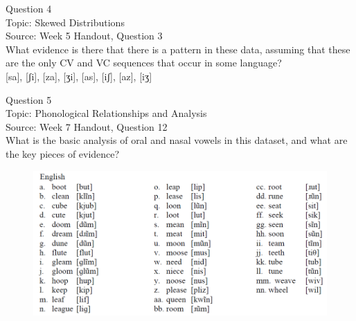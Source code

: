 \documentclass[12pt]{article}
\begin{document}
{\large Question 4}\\

Topic: Skewed Distributions\\
Source: Week 5 Handout, Question 3\\

What evidence is there that there is a pattern in these data, assuming that these are the only CV and VC sequences that occur in some language?\\

{[sa]}, {[ʃi]}, {[za]}, {[ʒi]}, {[as]}, {[iʃ]}, {[az]}, {[iʒ]}


\newpage

{\large Question 5}\\

Topic: Phonological Relationships and Analysis\\
Source: Week 7 Handout, Question 12\\

What is the basic analysis of oral and nasal vowels in this dataset, and what are the key pieces of evidence?\\

\begin{figure}[H]
\includegraphics{../images/english12.png}
\end{figure}

\newpage

\begin{center}
\textbf{{\color{red}{\HUGE END OF EXAM}}}\\

\end{center}
\newpage

\begin{center}
\textbf{{\color{blue}{\HUGE START OF EXAM\\}}}

\textbf{{\color{blue}{\HUGE Student ID: 38755\\}}}

\textbf{{\color{blue}{\HUGE \\}}}

\end{center}
\newpage
\end{document}
